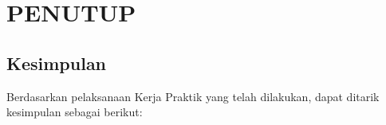 \chapter{PENUTUP}
\label{chap:penutup}

\section{Kesimpulan}
\label{sec:kesimpulan}

Berdasarkan pelaksanaan Kerja Praktik yang telah dilakukan, dapat ditarik kesimpulan sebagai berikut:

